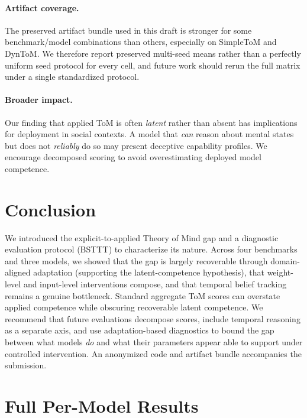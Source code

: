 \paragraph{Artifact coverage.} The preserved artifact bundle used in this draft is stronger for some benchmark/model combinations than others, especially on SimpleToM and DynToM.
We therefore report preserved multi-seed means rather than a perfectly uniform seed protocol for every cell, and future work should rerun the full matrix under a single standardized protocol.

\paragraph{Broader impact.} Our finding that applied ToM is often \emph{latent} rather than absent has implications for deployment in social contexts.
A model that \emph{can} reason about mental states but does not \emph{reliably} do so may present deceptive capability profiles.
We encourage decomposed scoring to avoid overestimating deployed model competence.


\section{Conclusion}
\label{sec:conclusion}

We introduced the explicit-to-applied Theory of Mind gap and a diagnostic evaluation protocol (BSTTT) to characterize its nature.
Across four benchmarks and three models, we showed that the gap is largely recoverable through domain-aligned adaptation (supporting the latent-competence hypothesis), that weight-level and input-level interventions compose, and that temporal belief tracking remains a genuine bottleneck.
Standard aggregate ToM scores can overstate applied competence while obscuring recoverable latent competence.
We recommend that future evaluations decompose scores, include temporal reasoning as a separate axis, and use adaptation-based diagnostics to bound the gap between what models \emph{do} and what their parameters appear able to support under controlled intervention.
An anonymized code and artifact bundle accompanies the submission.





\newpage
\appendix
\section{Full Per-Model Results}
\label{app:full_results}

